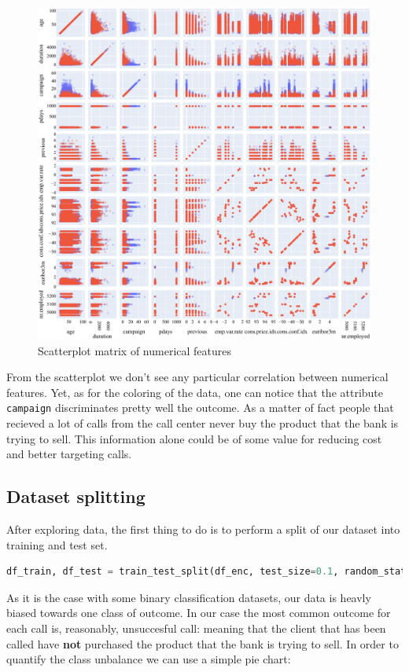 \begin{figure}[H]
    \centering
    \includegraphics[scale=0.55]{pictures/scatterplot.pdf}
    \caption{Scatterplot matrix of numerical features }
\end{figure}
From the scatterplot we don't see any particular correlation between numerical features. Yet, as for the coloring of the data, one can notice that the attribute \texttt{campaign} discriminates pretty well the outcome. As a matter of fact people that recieved a lot of calls from the call center never buy the product that the bank is trying to sell. This information alone could be of some value for reducing cost and better targeting calls.

\subsection{Dataset splitting}
After exploring data, the first thing to do is to perform a split of our dataset into training and test set.
\begin{lstlisting}[language=Python, caption= Data splitting]
    df_train, df_test = train_test_split(df_enc, test_size=0.1, random_state=42)
\end{lstlisting}
As it is the case with some binary classification datasets, our data is heavly biased towards one class of outcome. In our case the most common outcome for each call is, reasonably, unsuccesful call: meaning that the client that has been called have \textbf{not} purchased the product that the bank is trying to sell. In order to quantify the class unbalance we can use a simple pie chart:


